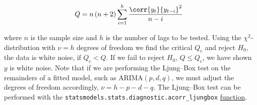 \begin{equation}\label{eq:time_series:ljung_box:Q}
Q = n \left(n+2\right) \sum_{i=1}^{h} \frac{\corr{y_{t}}{y_{t-i}}^{2}}{n-i}
\end{equation}

\noindent where $n$ is the sample size and $h$ is the number of lags to be tested.
Using the $\chi^{2}$-distribution with $\nu = h$ degrees of freedom we find the critical $Q_{c}$
and reject $H_{0}$, the data is white noise, if $Q_{c} < Q$.
If we fail to reject $H_{0}$, \ie $Q \leq Q_{c}$, we have shown $y$ is white noise.
Note that if we are performing the Ljung--Box test on the remainders of a fitted model, such as ARIMA$\left(p,d,q\right)$,
we must adjust the degrees of freedom accordingly, $\nu = h - p - d - q$.
The Ljung--Box test can be performed with the \texttt{statsmodels.stats.diagnostic.acorr\_ljungbox}
\href{https://www.statsmodels.org/dev/generated/statsmodels.stats.diagnostic.acorr_ljungbox.html}{function}.
